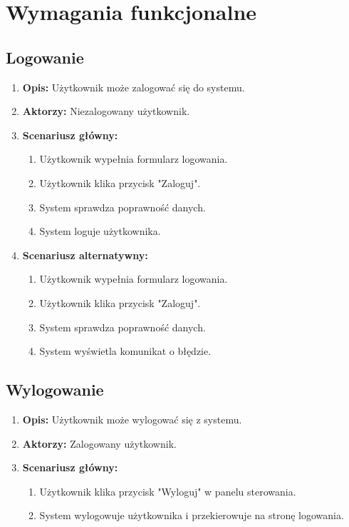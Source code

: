 \section{Wymagania funkcjonalne}
\subsection{Logowanie}
\begin{enumerate}
    \item \textbf{Opis:} Użytkownik może zalogować się do systemu.
    \item \textbf{Aktorzy:} Niezalogowany użytkownik.
    \item \textbf{Scenariusz główny:} 
    \begin{enumerate}
        \item Użytkownik wypełnia formularz logowania.
        \item Użytkownik klika przycisk "Zaloguj".
        \item System sprawdza poprawność danych.
        \item System loguje użytkownika.
    \end{enumerate}
    \item \textbf{Scenariusz alternatywny:} 
    \begin{enumerate}
        \item Użytkownik wypełnia formularz logowania.
        \item Użytkownik klika przycisk "Zaloguj".
        \item System sprawdza poprawność danych.
        \item System wyświetla komunikat o błędzie.
    \end{enumerate}
\end{enumerate}
\subsection{Wylogowanie}
\begin{enumerate}
    \item \textbf{Opis:} Użytkownik może wylogować się z systemu.
    \item \textbf{Aktorzy:} Zalogowany użytkownik.
    \item \textbf{Scenariusz główny:} 
    \begin{enumerate}
        \item Użytkownik klika przycisk "Wyloguj" w panelu sterowania.
        \item System wylogowuje użytkownika i przekierowuje na stronę logowania.
    \end{enumerate}
\end{enumerate}

